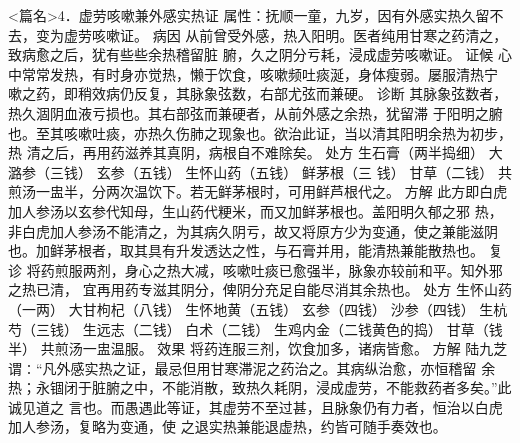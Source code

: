 \documentclass[a4paper,12pt,UTF8,twoside]{ctexbook}
\begin{document}
<篇名>4．虚劳咳嗽兼外感实热证
属性：抚顺一童，九岁，因有外感实热久留不去，变为虚劳咳嗽证。 
病因 从前曾受外感，热入阳明。医者纯用甘寒之药清之，致病愈之后，犹有些些余热稽留脏 
腑，久之阴分亏耗，浸成虚劳咳嗽证。 
证候 心中常常发热，有时身亦觉热，懒于饮食，咳嗽频吐痰涎，身体瘦弱。屡服清热宁 
嗽之药，即稍效病仍反复，其脉象弦数，右部尤弦而兼硬。 
诊断 其脉象弦数者，热久涸阴血液亏损也。其右部弦而兼硬者，从前外感之余热，犹留滞 
于阳明之腑也。至其咳嗽吐痰，亦热久伤肺之现象也。欲治此证，当以清其阳明余热为初步，热 
清之后，再用药滋养其真阴，病根自不难除矣。 
处方 生石膏（两半捣细） 大潞参（三钱） 玄参（五钱） 生怀山药（五钱） 鲜茅根（三 
钱） 甘草（二钱） 
共煎汤一盅半，分两次温饮下。若无鲜茅根时，可用鲜芦根代之。 
方解 此方即白虎加人参汤以玄参代知母，生山药代粳米，而又加鲜茅根也。盖阳明久郁之邪 
热，非白虎加人参汤不能清之，为其病久阴亏，故又将原方少为变通，使之兼能滋阴 
也。加鲜茅根者，取其具有升发透达之性，与石膏并用，能清热兼能散热也。 
复诊 将药煎服两剂，身心之热大减，咳嗽吐痰已愈强半，脉象亦较前和平。知外邪之热已清， 
宜再用药专滋其阴分，俾阴分充足自能尽消其余热也。 
处方 生怀山药（一两） 大甘枸杞（八钱） 生怀地黄（五钱） 玄参（四钱） 
沙参（四钱） 生杭芍（三钱） 生远志（二钱） 白术（二钱） 生鸡内金（二钱黄色的捣） 甘草（钱半） 
共煎汤一盅温服。 
效果 将药连服三剂，饮食加多，诸病皆愈。 
方解 陆九芝谓∶“凡外感实热之证，最忌但用甘寒滞泥之药治之。其病纵治愈，亦恒稽留 
余热；永锢闭于脏腑之中，不能消散，致热久耗阴，浸成虚劳，不能救药者多矣。”此诚见道之 
言也。而愚遇此等证，其虚劳不至过甚，且脉象仍有力者，恒治以白虎加人参汤，复略为变通，使 
之退实热兼能退虚热，约皆可随手奏效也。 
\end{document}
